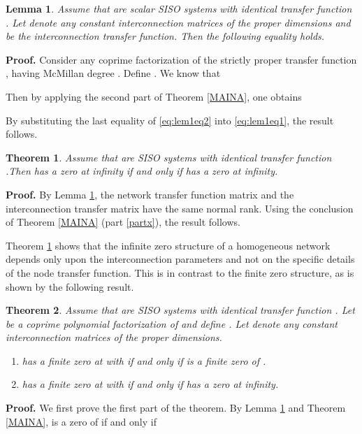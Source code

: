 \documentclass[twocolumn]{autart}    \usepackage{amsmath}
\newtheorem{theorem}{Theorem}
\newtheorem{lemma}{Lemma}
\begin{document}
\begin{lemma}\label{lem:normalrank}
Assume that   are scalar SISO systems with identical transfer function . Let  denote any constant interconnection matrices of the proper dimensions  and  be the interconnection transfer function. Then the following equality holds.

\end{lemma}
\noindent \textbf{Proof.}
Consider any coprime factorization  of the
strictly proper transfer function , having McMillan degree
. Define .  We know that

Then by applying the second part of  Theorem \ref{MAINA},  one obtains

By substituting the last equality of \eqref{eq:lem1eq2} into \eqref{eq:lem1eq1}, the result follows.

\hfill 


\begin{theorem}\label{MAIN-B1}
Assume that   are SISO systems with identical transfer
function .Then   has
a zero at infinity if and only if  has a
zero at infinity.
\end{theorem}


\noindent \textbf{Proof.}
By Lemma \ref{lem:normalrank}, the network transfer function matrix  and the interconnection transfer matrix  have the same normal rank. Using the conclusion of Theorem \ref{MAINA} (part \ref{partx}), the result follows.
\hfill 

Theorem \ref{MAIN-B1}   shows that the infinite zero structure of
a homogeneous network depends only upon the interconnection parameters
and not on the specific details of the node transfer function.
This is in contrast to the finite zero structure, as is shown by the
following result.

\begin{theorem}\label{MAIN-B}
Assume that   are
SISO systems with identical transfer function . Let  be a coprime polynomial factorization of  and define .  Let  denote any constant interconnection matrices of the proper dimensions. \begin{enumerate}

\item
  has a finite zero at  with  if and only if   is a finite zero of
.
\item   has a finite zero at  with  if and only if  has a zero at infinity.
\end{enumerate}
\end{theorem}


\noindent \textbf{Proof.}
We first prove the first part of the theorem.  By Lemma \ref{lem:normalrank} and Theorem \ref{MAINA},  is a zero of  if and
only if
 
\end{document}
